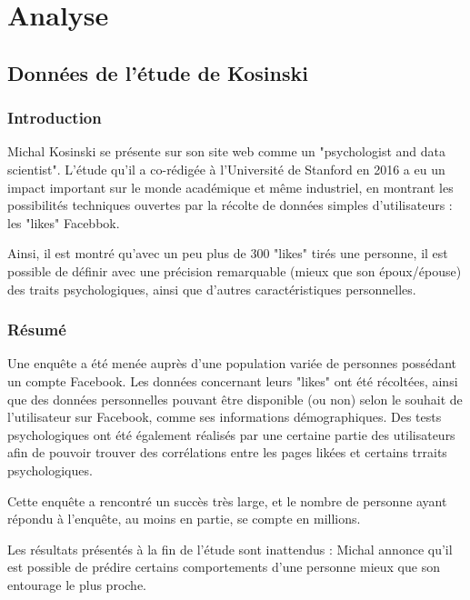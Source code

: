 
\section{Analyse}

	\subsection{Données de l'étude de Kosinski}

		\subsubsection{Introduction}

			Michal Kosinski se présente sur son site web\cite{michal-kosinski} comme un "psychologist and data scientist". L'étude qu'il a co-rédigée à l'Université de Stanford en 2016 a eu un impact important sur le monde académique et même industriel, en montrant les possibilités techniques ouvertes par la récolte de données simples d'utilisateurs : les "likes" Facebbok.

			Ainsi, il est montré qu'avec un peu plus de 300 "likes" tirés une personne, il est possible de définir avec une précision remarquable (mieux que son époux/épouse) des traits psychologiques, ainsi que d'autres caractéristiques personnelles.

		\subsubsection{Résumé}

			Une enquête a été menée auprès d'une population variée de personnes possédant un compte Facebook. Les données concernant leurs "likes" ont été récoltées, ainsi que des données personnelles pouvant être disponible (ou non) selon le souhait de l'utilisateur sur Facebook, comme ses informations démographiques. Des tests psychologiques ont été également réalisés par une certaine partie des utilisateurs afin de pouvoir trouver des corrélations entre les pages likées et certains trraits psychologiques.

			Cette enquête a rencontré un succès très large, et le nombre de personne ayant répondu à l'enquête, au moins en partie, se compte en millions.

			Les résultats présentés à la fin de l'étude sont inattendus : Michal annonce qu'il est possible de prédire certains comportements d'une personne mieux que son entourage le plus proche.

